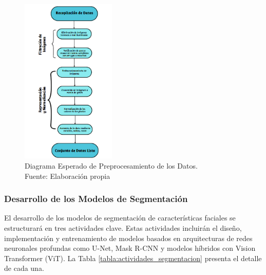 \begin{figure}[H]
     \begin{center}
         \includegraphics[width=0.4\textwidth]{3/figures/Diagrama de preprocesamiento.png}
         \caption[Diagrama Esperado de Preprocesamiento de los Datos]{Diagrama Esperado de Preprocesamiento de los Datos.\\
         Fuente: Elaboración propia}
         \label{3:fig4}
     \end{center}
 \end{figure}


 \subsubsection{Desarrollo de los Modelos de Segmentación}
 El desarrollo de los modelos de segmentación de características faciales se estructurará en tres actividades clave. Estas actividades incluirán el diseño, implementación y entrenamiento de modelos basados en arquitecturas de redes neuronales profundas como U-Net, Mask R-CNN y modelos híbridos con Vision Transformer (ViT). La Tabla \ref{tabla:actividades_segmentacion} presenta el detalle de cada una.

